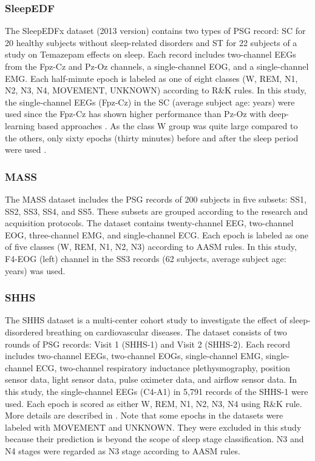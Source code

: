 \documentclass[10pt,twocolumn,twoside]{IEEEtran}
\begin{document}
    \subsubsection{SleepEDF} 
    The SleepEDFx dataset (2013 version) contains two types of PSG record: SC for 20 healthy subjects without sleep-related disorders and ST for 22 subjects of a study on Temazepam effects on sleep. Each record includes two-channel EEGs from the Fpz-Cz and Pz-Oz channels, a single-channel EOG, and a single-channel EMG. Each half-minute epoch is labeled as one of eight classes (W, REM, N1, N2, N3, N4, MOVEMENT, UNKNOWN) according to R\&K rules. In this study, the single-channel EEGs (Fpz-Cz) in the SC (average subject age:    years) were used since the Fpz-Cz has shown higher performance than Pz-Oz with deep-learning based approaches  \cite{tsinalis2016automatic, supratak2017deepsleepnet}. As the class W group was quite large compared to the others, only sixty epochs (thirty minutes) before and after the sleep period were used \cite{supratak2017deepsleepnet}. 
    
    \subsubsection{MASS} 
    The MASS dataset includes the PSG records of 200 subjects in five subsets: SS1, SS2, SS3, SS4, and SS5. These subsets are grouped according to the research and acquisition protocols. The dataset contains twenty-channel EEG, two-channel EOG, three-channel EMG, and single-channel ECG. Each epoch is labeled as one of five classes (W, REM, N1, N2, N3) according to AASM rules. In this study, F4-EOG (left) channel in the SS3 records (62 subjects, average subject age:    years) was used.
    
    \subsubsection{SHHS}
    The SHHS dataset is a multi-center cohort study to investigate the effect of sleep-disordered breathing on cardiovascular diseases. The dataset consists of two rounds of PSG records: Visit 1 (SHHS-1) and Visit 2 (SHHS-2). Each record includes two-channel EEGs, two-channel EOGs, single-channel EMG, single-channel ECG, two-channel respiratory inductance plethysmography, position sensor data, light sensor data, pulse oximeter data, and airflow sensor data. In this study, the single-channel EEGs (C4-A1) in 5,791 records of the SHHS-1 were used. Each epoch is scored as either W, REM, N1, N2, N3, N4 using R\&K rule. More details are described in \cite{NSRR}.
    Note that some epochs in the datasets were labeled with MOVEMENT and UNKNOWN. They were excluded in this study because their prediction is beyond the scope of sleep stage classification. N3 and N4 stages were regarded as N3 stage according to AASM rules.
    
\end{document}
